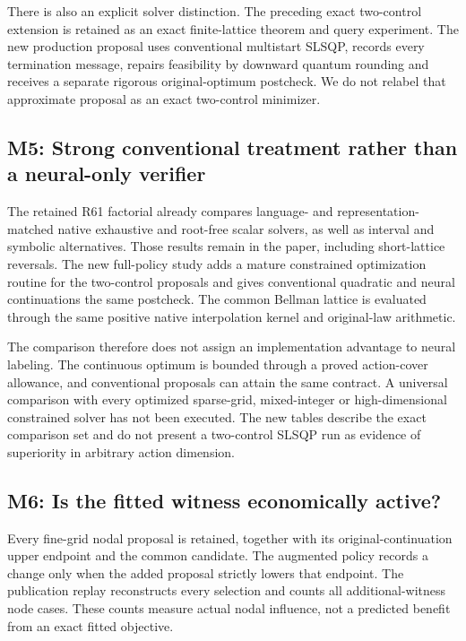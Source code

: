 \documentclass[ecta,nameyear,draft]{econsocart}
\begin{document}
There is also an explicit solver distinction. The preceding exact
two-control extension is retained as an exact finite-lattice theorem and
query experiment. The new production proposal uses conventional
multistart SLSQP, records every termination message, repairs feasibility
by downward quantum rounding and receives a separate rigorous
original-optimum postcheck. We do not relabel that approximate proposal
as an exact two-control minimizer.

\hypertarget{m5-strong-conventional-treatment-rather-than-a-neural-only-verifier}{%
\subsection{M5: Strong conventional treatment rather than a neural-only
verifier}\label{m5-strong-conventional-treatment-rather-than-a-neural-only-verifier}}

The retained R61 factorial already compares language- and
representation-matched native exhaustive and root-free scalar solvers,
as well as interval and symbolic alternatives. Those results remain in
the paper, including short-lattice reversals. The new full-policy study
adds a mature constrained optimization routine for the two-control
proposals and gives conventional quadratic and neural continuations the
same postcheck. The common Bellman lattice is evaluated through the same
positive native interpolation kernel and original-law arithmetic.

The comparison therefore does not assign an implementation advantage to
neural labeling. The continuous optimum is bounded through a proved
action-cover allowance, and conventional proposals can attain the same
contract. A universal comparison with every optimized sparse-grid,
mixed-integer or high-dimensional constrained solver has not been
executed. The new tables describe the exact comparison set and do not
present a two-control SLSQP run as evidence of superiority in arbitrary
action dimension.

\hypertarget{m6-is-the-fitted-witness-economically-active}{%
\subsection{M6: Is the fitted witness economically
active?}\label{m6-is-the-fitted-witness-economically-active}}

Every fine-grid nodal proposal is retained, together with its
original-continuation upper endpoint and the common candidate. The
augmented policy records a change only when the added proposal strictly
lowers that endpoint. The publication replay reconstructs every
selection and counts all additional-witness node cases. These counts
measure actual nodal influence, not a predicted benefit from an exact
fitted objective.
\end{document}
